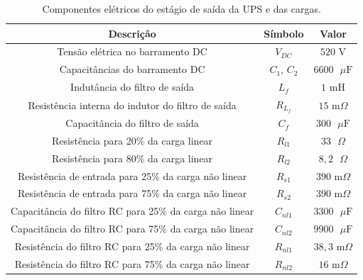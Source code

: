 \documentclass[repeatfields,oneside]{tcc}
\begin{document}
\begin{table}[h]
    \centering
    \caption{Componentes elétricos do estágio de saída da UPS e das cargas.}
    \begin{tabular}{c|c|c}
        \textbf{Descrição}                                      & \textbf{Símbolo} & \textbf{Valor}          \\\hline
        Tensão elétrica no barramento DC                        & $V_{DC}$         & $520  \text{ V}$        \\\hline
        Capacitâncias do barramento DC                          & $C_1$, $C_2$     & $6600 \text{ }\mu \text{F}$    \\\hline
        Indutância do filtro de saída                           & $L_f$            & $1    \text{ mH}$       \\\hline
        Resistência interna do indutor do filtro de saída       & $R_{L_f}$        & $15   \text{ m}\Omega$  \\\hline
        Capacitância do filtro de saída                         & $C_f$            & $300  \text{ }\mu \text{F}$    \\\hline
        Resistência para 20\% da carga linear                   & $R_{l1}$         & $33   \text{ }\Omega$   \\\hline
        Resistência para 80\% da carga linear                   & $R_{l2}$         & $8,2  \text{ }\Omega$   \\\hline
        Resistência de entrada para 25\% da carga não linear    & $R_{s1}$         & $390  \text{ m}\Omega$  \\\hline
        Resistência de entrada para 75\% da carga não linear    & $R_{s2}$         & $390  \text{ m}\Omega$  \\\hline
        Capacitância do filtro RC para 25\% da carga não linear & $C_{nl1}$        & $3300 \text{ }\mu \text{F}$    \\\hline
        Capacitância do filtro RC para 75\% da carga não linear & $C_{nl2}$        & $9900 \text{ }\mu \text{F}$    \\\hline
        Resistência do filtro RC para 25\% da carga não linear  & $R_{nl1}$        & $38,3 \text{ m}\Omega$  \\\hline
        Resistência do filtro RC para 75\% da carga não linear  & $R_{nl2}$        & $16   \text{ m}\Omega$
    \end{tabular}
    \\\vspace{0.25cm}
    \label{tab:UPS_param}
\end{table}
\end{document}
